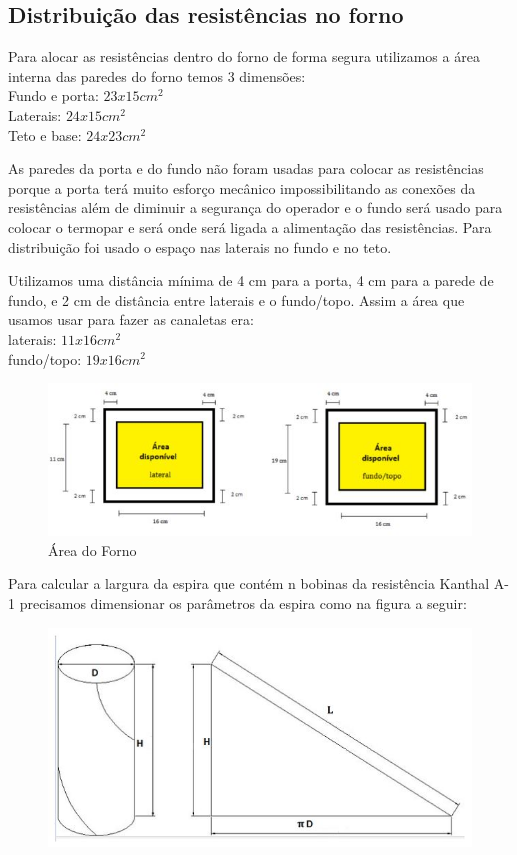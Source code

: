 \subsection{Distribuição das resistências no forno}

Para alocar as resistências dentro do forno de forma segura utilizamos a área interna das paredes do forno temos 3 dimensões:
\\Fundo e porta: $23x15 cm^2$
\\Laterais: $24x15cm^2$
\\Teto e base: $24x23cm^2$


As paredes da porta e do fundo não foram usadas para colocar as resistências porque a porta terá muito esforço mecânico impossibilitando as conexões da resistências além de diminuir a segurança do operador e o fundo será usado para colocar o termopar e será onde será ligada a alimentação das resistências. Para distribuição foi usado o espaço nas laterais no fundo e no teto.

Utilizamos uma distância mínima de 4 cm para a porta, 4 cm para a parede de fundo, e 2 cm de distância entre laterais e o fundo/topo. Assim a área que usamos usar para fazer as canaletas era:
\\laterais: $11x16cm^2$
\\fundo/topo: $19x16cm^2$

\begin{figure}[H]
	\centering
	\label{areaforno}
	\includegraphics[keepaspectratio=true,scale=1.0]{figuras/alimentacao2.JPG}
	\caption{Área do Forno}
\end{figure}

Para calcular a largura da espira que contém n bobinas da resistência Kanthal A-1 precisamos dimensionar os parâmetros da espira como na figura a seguir:

\begin{figure}[H]
	\centering
	\label{areaforno}
	\includegraphics[keepaspectratio=true,scale=1.0]{figuras/alimentacao3.JPG}
\end{figure}

